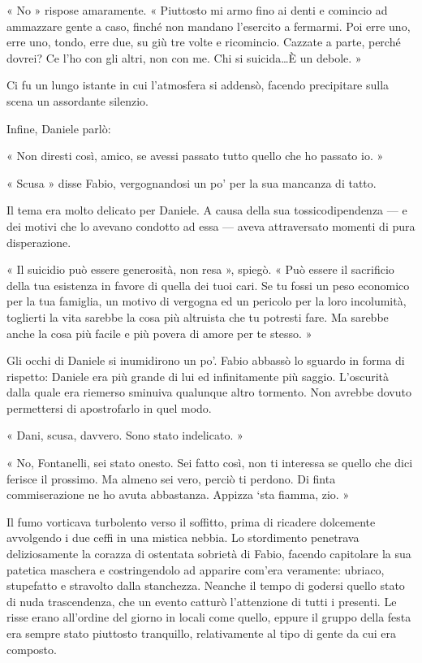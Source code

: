 « No » rispose amaramente. « Piuttosto mi armo fino ai denti e comincio ad ammazzare gente a caso, finché non mandano l'esercito a fermarmi. Poi erre uno, erre uno, tondo, erre due, su giù tre volte e ricomincio. Cazzate a parte, perché dovrei? Ce l'ho con gli altri, non con me. Chi si suicida\ldots È un debole. »

Ci fu un lungo istante in cui l'atmosfera si addensò, facendo precipitare sulla scena un assordante silenzio.

Infine, Daniele parlò:

« Non diresti così, amico, se avessi passato tutto quello che ho passato io. »

« Scusa » disse Fabio, vergognandosi un po' per la sua mancanza di tatto.

Il tema era molto delicato per Daniele. A causa della sua tossicodipendenza --- e dei motivi che lo avevano condotto ad essa --- aveva attraversato momenti di pura disperazione.

« Il suicidio può essere generosità, non resa », spiegò. « Può essere il sacrificio della tua esistenza in favore di quella dei tuoi cari. Se tu fossi un peso economico per la tua famiglia, un motivo di vergogna ed un pericolo per la loro incolumità, toglierti la vita sarebbe la cosa più altruista che tu potresti fare. Ma sarebbe anche la cosa più facile e più povera di amore per te stesso. »

Gli occhi di Daniele si inumidirono un po'. Fabio abbassò lo sguardo in forma di rispetto: Daniele era più grande di lui ed infinitamente più saggio. L'oscurità dalla quale era riemerso sminuiva qualunque altro tormento. Non avrebbe dovuto permettersi di apostrofarlo in quel modo.

« Dani, scusa, davvero. Sono stato indelicato. »

« No, Fontanelli, sei stato onesto. Sei fatto così, non ti interessa se quello che dici ferisce il prossimo. Ma almeno sei vero, perciò ti perdono. Di finta commiserazione ne ho avuta abbastanza. Appizza `sta fiamma, zio. »

Il fumo vorticava turbolento verso il soffitto, prima di ricadere dolcemente avvolgendo i due ceffi in una mistica nebbia. Lo stordimento penetrava deliziosamente la corazza di ostentata sobrietà di Fabio, facendo capitolare la sua patetica maschera e costringendolo ad apparire com'era veramente: ubriaco, stupefatto e stravolto dalla stanchezza. Neanche il tempo di godersi quello stato di nuda trascendenza, che un evento catturò l'attenzione di tutti i presenti. Le risse erano all'ordine del giorno in locali come quello, eppure il gruppo della festa era sempre stato piuttosto tranquillo, relativamente al tipo di gente da cui era composto.


